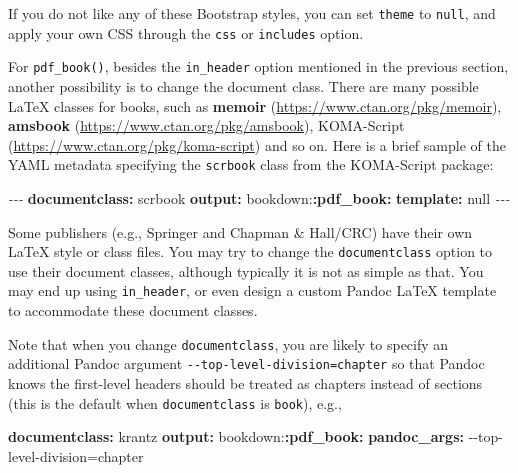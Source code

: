 \documentclass[
  12pt,
]{krantz}
\newenvironment{Shaded}{\begin{snugshade}}{\end{snugshade}}
\newcommand{\AttributeTok}[1]{\textcolor[rgb]{0.13,0.29,0.53}{#1}}
\newcommand{\CharTok}[1]{\textcolor[rgb]{0.31,0.60,0.02}{#1}}
\newcommand{\FunctionTok}[1]{\textcolor[rgb]{0.13,0.29,0.53}{\textbf{#1}}}
\newcommand{\KeywordTok}[1]{\textcolor[rgb]{0.13,0.29,0.53}{\textbf{#1}}}
\newcommand{\PreprocessorTok}[1]{\textcolor[rgb]{0.56,0.35,0.01}{\textit{#1}}}
\begin{document}
If you do not like any of these Bootstrap styles, you can set \texttt{theme} to \texttt{null}, and apply your own CSS through the \texttt{css} or \texttt{includes} option.

For \texttt{pdf\_book()}, besides the \texttt{in\_header} option mentioned in the previous section, another possibility is to change the document class. There are many possible LaTeX classes for books, such as \textbf{memoir} (\url{https://www.ctan.org/pkg/memoir}), \textbf{amsbook} (\url{https://www.ctan.org/pkg/amsbook}), KOMA-Script (\url{https://www.ctan.org/pkg/koma-script}) and so on. Here is a brief sample of the YAML metadata specifying the \texttt{scrbook} class from the KOMA-Script package:

\begin{Shaded}
\begin{Highlighting}[]
\PreprocessorTok{{-}{-}{-}}
\FunctionTok{documentclass}\KeywordTok{:}\AttributeTok{ scrbook}
\FunctionTok{output}\KeywordTok{:}
\AttributeTok{  bookdown:}\FunctionTok{:pdf\_book}\KeywordTok{:}
\AttributeTok{    }\FunctionTok{template}\KeywordTok{:}\AttributeTok{ }\CharTok{null}
\PreprocessorTok{{-}{-}{-}}
\end{Highlighting}
\end{Shaded}

Some publishers (e.g., Springer and Chapman \& Hall/CRC) have their own LaTeX style or class files. You may try to change the \texttt{documentclass} option to use their document classes, although typically it is not as simple as that. You may end up using \texttt{in\_header}, or even design a custom Pandoc LaTeX template to accommodate these document classes.

Note that when you change \texttt{documentclass}, you are likely to specify an additional Pandoc argument \texttt{-\/-top-level-division=chapter} so that Pandoc knows the first-level headers should be treated as chapters instead of sections (this is the default when \texttt{documentclass} is \texttt{book}), e.g.,

\begin{Shaded}
\begin{Highlighting}[]
\FunctionTok{documentclass}\KeywordTok{:}\AttributeTok{ krantz}
\FunctionTok{output}\KeywordTok{:}
\AttributeTok{  bookdown:}\FunctionTok{:pdf\_book}\KeywordTok{:}
\AttributeTok{    }\FunctionTok{pandoc\_args}\KeywordTok{:}\AttributeTok{ {-}{-}top{-}level{-}division=chapter}
\end{Highlighting}
\end{Shaded}
\end{document}
